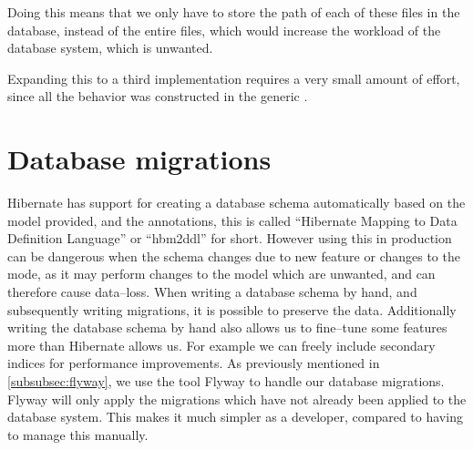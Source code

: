Doing this means that we only have to store the path of each of these files in the database, 
instead of the entire files, which would increase the workload of the database system, which is unwanted.

Expanding this to a third implementation requires a very small amount of effort, since all the behavior was constructed in the generic .

\section{Database migrations}
Hibernate has support for creating a database schema automatically based on the model provided, and the annotations,
this is called ``Hibernate Mapping to Data Definition Language'' or ``hbm2ddl'' for short.
However using this in production can be dangerous when the schema changes due to new feature or changes to the mode,
as it may perform changes to the model which are unwanted,
and can therefore cause data--loss\cite[p.~64]{javapersistence}.
When writing a database schema by hand, and subsequently writing migrations, it is possible to preserve the data.
Additionally writing the database schema by hand also allows us to fine--tune some features more than Hibernate allows us.
For example we can freely include secondary indices for performance improvements.
As previously mentioned in \cref{subsubsec:flyway}, we use the tool Flyway to handle our database migrations.
Flyway will only apply the migrations which have not already been applied to the database system.
This makes it much simpler as a developer, compared to having to manage this manually.


